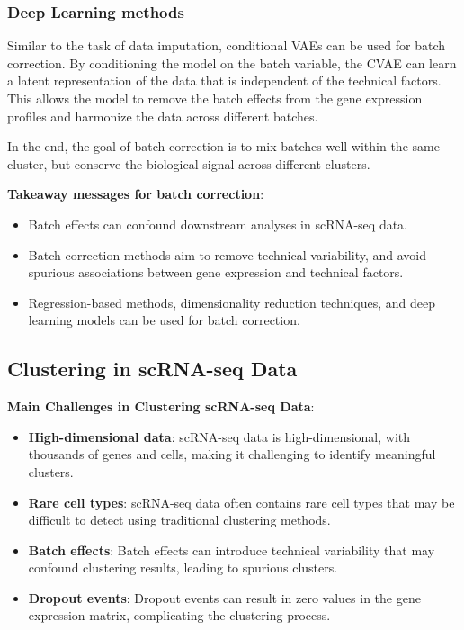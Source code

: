 \documentclass[a4paper]{article}
\begin{document}
\subsubsection*{Deep Learning methods}

Similar to the task of data imputation, conditional VAEs can be used for
batch correction. By conditioning the model on the batch variable, the
CVAE can learn a latent representation of the data that is independent
of the technical factors. This allows the model to remove the batch effects
from the gene expression profiles and harmonize the data across different
batches.

In the end, the goal of batch correction is to mix batches well within
the same cluster, but conserve the biological signal across different
clusters.

\textbf{Takeaway messages for batch correction}:

\begin{itemize}
  \item Batch effects can confound downstream analyses in scRNA-seq data.
  \item Batch correction methods aim to remove technical variability, and avoid
  spurious associations between gene expression and technical factors.
  \item Regression-based methods, dimensionality reduction techniques, and deep
  learning models can be used for batch correction.
\end{itemize}

\subsection*{Clustering in scRNA-seq Data}

\textbf{Main Challenges in Clustering scRNA-seq Data}:

\begin{itemize}
  \item \textbf{High-dimensional data}: scRNA-seq data is high-dimensional, with
  thousands of genes and cells, making it challenging to identify
  meaningful clusters.
  \item \textbf{Rare cell types}: scRNA-seq data often contains rare cell types
  that may be difficult to detect using traditional clustering methods.
  \item \textbf{Batch effects}: Batch effects can introduce technical variability
  that may confound clustering results, leading to spurious clusters.
  \item \textbf{Dropout events}: Dropout events can result in zero values in the
  gene expression matrix, complicating the clustering process.
\end{itemize}
\end{document}
